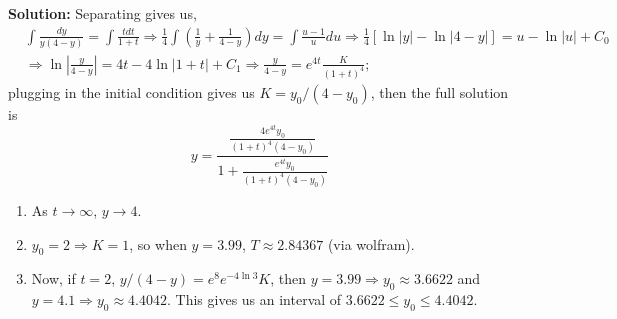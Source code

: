 \documentclass[reqno]{amsart}
\theoremstyle{definition}
\begin{document}
\begin{enumerate}
\textbf{Solution:  }
Separating gives us,
%
\begin{align*}
&\int \frac{dy}{y(4-y)} = \int \frac{tdt}{1+t} \Rightarrow  \frac{1}{4}\int\left(\frac{1}{y} + \frac{1}{4-y}\right)dy
= \int \frac{u-1}{u}du
\Rightarrow \frac{1}{4}\left[\ln|y| - \ln|4-y|\right] = u - \ln|u| + C_0\\
&\Rightarrow \ln|\frac{y}{4-y}| = 4t - 4\ln|1+t| + C_1 \Rightarrow \frac{y}{4-y} = e^{4t}\frac{K}{(1+t)^4};
\end{align*}
%
plugging in the initial condition gives us $K = y_0/(4-y_0)$, then the full solution is
%
\begin{equation}
y = \frac{\frac{4e^{4t}y_0}{(1+t)^4(4-y_0)}}{1 + \frac{e^{4t}y_0}{(1+t)^4(4-y_0)}}
\end{equation}

\begin{enumerate}

\item  As $t \rightarrow \infty$, $y \rightarrow 4$.

\item  $y_0 = 2 \Rightarrow K = 1$, so when $y = 3.99$, $T \approx 2.84367$ (via wolfram).

\item  Now, if $t = 2$, $y/(4-y) = e^8e^{-4\ln 3}K$, then $y = 3.99 \Rightarrow y_0 \approx 3.6622$
and $y = 4.1 \Rightarrow y_0 \approx 4.4042$.  This gives us an interval of $3.6622 \leq y_0 \leq 4.4042$.

\end{enumerate}

\end{enumerate}
\end{document}
